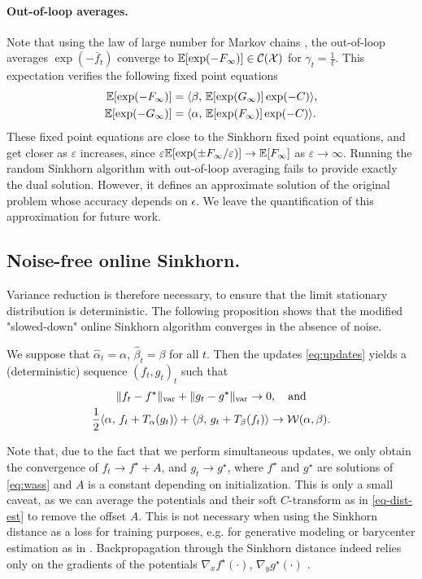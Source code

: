 \paragraph{Out-of-loop averages.} Note that using the law of large number for Markov chains
\citep{breiman_strong_1960}, the out-of-loop averages $\exp(-\bar f_t)$
converge to $\mathbb{E}[\exp(-F_\infty)] \in \mathcal{C}(\mathcal{X})$ for $\gamma_t = \frac{1}{t}$. This expectation verifies the following fixed point equations
\begin{align}
    \mathbb{E}[\exp(-F_\infty)] &=
     \langle \beta,\,\mathbb{E}[\exp(G_\infty)] \exp(-C)\rangle, \\
    \mathbb{E}[\exp(-G_\infty)] &=
     \langle \alpha,\,\mathbb{E}[\exp(F_\infty)] \exp(-C)\rangle.
\end{align}
These fixed point equations are close to the Sinkhorn fixed point equations, and
get closer as $\varepsilon$ increases, since $\varepsilon \mathbb{E}[\exp(\pm F_\infty /
\varepsilon)] \to \mathbb{E}[F_\infty]$ as $\varepsilon \to \infty$. Running the random
Sinkhorn algorithm with out-of-loop averaging fails to provide exactly the dual solution.
However, it defines an approximate solution of the original problem whose accuracy depends on $\epsilon$. 
%
We leave the quantification of this approximation for future work.

\subsection{Noise-free online Sinkhorn.}

Variance reduction is therefore necessary, to ensure that the limit stationary
distribution is deterministic. The following proposition shows that the modified "slowed-down" online Sinkhorn algorithm converges in the absence of noise.

\begin{proposition}\label{eq:deterministic}
    We suppose that $\hat \alpha_t = \alpha$, $\hat \beta_t = \beta$ for all
    $t$. Then the updates \eqref{eq:updates} yields a (deterministic) sequence $(f_t, g_t)_t$ such
    that 
    \begin{gather}
        \Vert f_t - f^\star \Vert_{\text{var}} 
        + \Vert g_t - g^\star \Vert_{\text{var}} \to 0,\quad\text{and} \\
        \frac{1}{2} \langle \alpha,\,f_t + T_{\alpha}(g_t)\rangle + \langle \beta,\,g_t + T_{\beta}(f_t)\rangle 
         \to \mathcal{W}(\alpha, \beta).
    \end{gather}
\end{proposition}
Note that, due to the fact that we perform simultaneous updates, we only obtain
the convergence of $f_t \to f^\star + A$, and $g_t \to g^\star$, where $f^\star$
and $g^\star$ are solutions of \eqref{eq:wass} and $A$ is a constant depending
on initialization. This is only a small caveat, as we can average the potentials
and their soft $C$-transform as in \eqref{eq-dist-est} to remove the offset $A$.
This is not necessary when using the Sinkhorn distance as a loss for training
purposes, e.g. for generative modeling or barycenter estimation as in
\citet{staib2017parallel}. Backpropagation through the Sinkhorn distance indeed
relies only on the gradients of the potentials $\nabla_x f^\star(\cdot)$,
$\nabla_y g^\star(\cdot)$ \citep[e.g.][]{cuturi2018semidual}.
